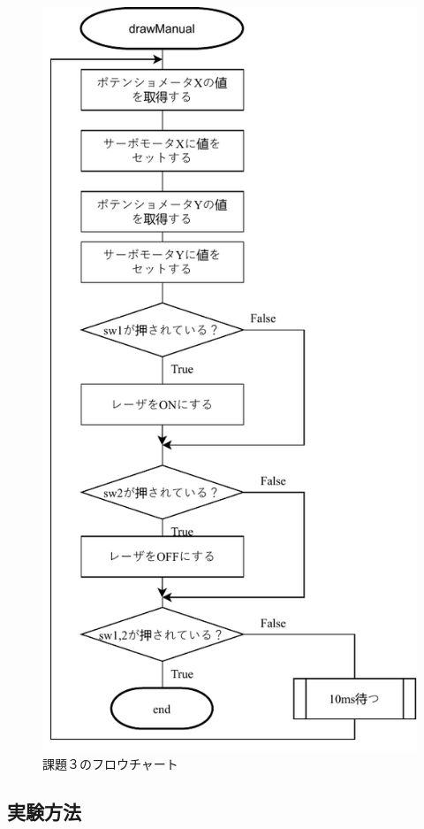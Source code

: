 \documentclass{jarticle}
\begin{document}
\begin{figure}[H]
    \centering
    \includegraphics{kumikomi3.pdf}
    \caption{課題３のフロウチャート}
    \label{fig:my_label}
\end{figure}

\subsection{実験方法}
\end{document}
